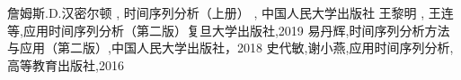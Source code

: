 \documentclass[12pt, a4paper, oneside]{ctexbook}
\begin{document}
\begin{thebibliography}{4}
    詹姆斯.D.汉密尔顿 {,} 时间序列分析（上册） {,} 中国人民大学出版社
    王黎明 {,} 王连等{,}应用时间序列分析（第二版）复旦大学出版社{,}2019
    易丹辉{,}时间序列分析方法与应用（第二版）{,}中国人民大学出版社，2018
    史代敏{,}谢小燕{,}应用时间序列分析{,}高等教育出版社{,}2016
\end{thebibliography}

\appendix
\end{document}
